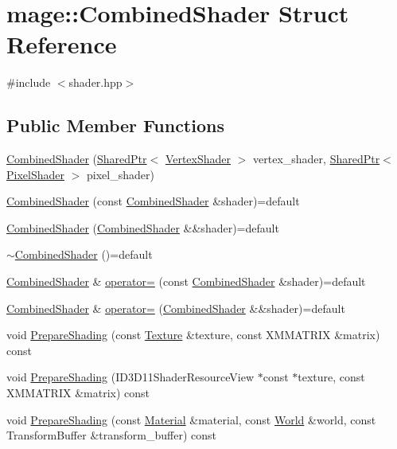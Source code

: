 \hypertarget{structmage_1_1_combined_shader}{}\section{mage\+:\+:Combined\+Shader Struct Reference}
\label{structmage_1_1_combined_shader}


{\ttfamily \#include $<$shader.\+hpp$>$}

\subsection*{Public Member Functions}
\begin{DoxyCompactItemize}
\item 
\hyperlink{structmage_1_1_combined_shader_ab9d6ce4dc9ed2602b19729ee8d126f61}{Combined\+Shader} (\hyperlink{namespacemage_a1e01ae66713838a7a67d30e44c67703e}{Shared\+Ptr}$<$ \hyperlink{classmage_1_1_vertex_shader}{Vertex\+Shader} $>$ vertex\+\_\+shader, \hyperlink{namespacemage_a1e01ae66713838a7a67d30e44c67703e}{Shared\+Ptr}$<$ \hyperlink{classmage_1_1_pixel_shader}{Pixel\+Shader} $>$ pixel\+\_\+shader)
\item 
\hyperlink{structmage_1_1_combined_shader_afc4a237b78efe6b13d6e569ede301b62}{Combined\+Shader} (const \hyperlink{structmage_1_1_combined_shader}{Combined\+Shader} \&shader)=default
\item 
\hyperlink{structmage_1_1_combined_shader_a74c1a44f6b1ec3cc1734b18b337441d3}{Combined\+Shader} (\hyperlink{structmage_1_1_combined_shader}{Combined\+Shader} \&\&shader)=default
\item 
\hyperlink{structmage_1_1_combined_shader_a6b1767d2525724f2f9120df87253973e}{$\sim$\+Combined\+Shader} ()=default
\item 
\hyperlink{structmage_1_1_combined_shader}{Combined\+Shader} \& \hyperlink{structmage_1_1_combined_shader_a14859fb597c07309fd269b56af373c02}{operator=} (const \hyperlink{structmage_1_1_combined_shader}{Combined\+Shader} \&shader)=default
\item 
\hyperlink{structmage_1_1_combined_shader}{Combined\+Shader} \& \hyperlink{structmage_1_1_combined_shader_ad05cf0e2c4f0cd7d37ad5be971aefd1b}{operator=} (\hyperlink{structmage_1_1_combined_shader}{Combined\+Shader} \&\&shader)=default
\item 
void \hyperlink{structmage_1_1_combined_shader_a4bdcd586139988dee2891df899de5ff2}{Prepare\+Shading} (const \hyperlink{classmage_1_1_texture}{Texture} \&texture, const X\+M\+M\+A\+T\+R\+IX \&matrix) const
\item 
void \hyperlink{structmage_1_1_combined_shader_acbb0b2257e3ffe5fd7aade0851c0fb95}{Prepare\+Shading} (I\+D3\+D11\+Shader\+Resource\+View $\ast$const $\ast$texture, const X\+M\+M\+A\+T\+R\+IX \&matrix) const
\item 
void \hyperlink{structmage_1_1_combined_shader_a896024e565638a4f36d83ad30e540e50}{Prepare\+Shading} (const \hyperlink{structmage_1_1_material}{Material} \&material, const \hyperlink{classmage_1_1_world}{World} \&world, const Transform\+Buffer \&transform\+\_\+buffer) const
\end{DoxyCompactItemize}
